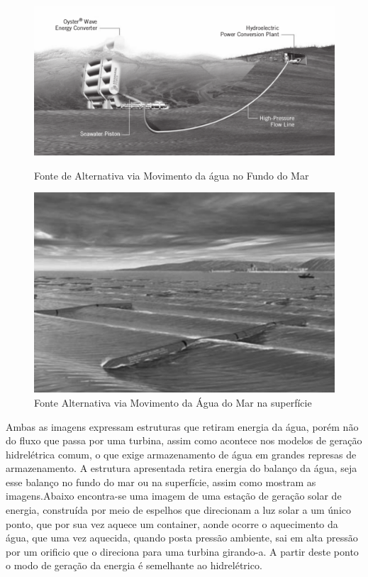 \documentclass[11pt, a4paper, oneside]{article}
\begin{document}
\begin{figure}[h!]
  \centering
  \begin{minipage}[b]{0.45\textwidth}
    \includegraphics[width=\textwidth]{Alternative_energy2}
    \caption{Fonte de Alternativa via Movimento da água no Fundo do Mar \cite{mecanica_dos_fluidos}}
  \end{minipage}
  \hfill
  \begin{minipage}[b]{0.45\textwidth}
    \includegraphics[width=\textwidth]{Alternative_energy1}
    \caption{Fonte Alternativa via Movimento da Água do Mar na superfície \cite{mecanica_dos_fluidos}}
  \end{minipage}
\end{figure}

Ambas as imagens expressam estruturas que retiram energia da água,
porém não do fluxo que passa por uma turbina, assim como acontece nos modelos de
geração hidrelétrica comum, o que exige armazenamento de água em grandes
represas de armazenamento. A estrutura apresentada retira energia do balanço da
água, seja esse balanço no fundo do mar ou na superfície, assim como mostram as
imagens.Abaixo encontra-se uma imagem de uma estação de geração solar de
energia, construída por meio de espelhos que direcionam a luz solar a um único
ponto, que por sua vez aquece um container, aonde ocorre o aquecimento da água, que uma vez aquecida, quando posta pressão ambiente, sai em alta pressão por um
orificio que o direciona para uma turbina girando-a. A partir deste ponto o modo de geração da energia é semelhante ao hidrelétrico.
\end{document}
